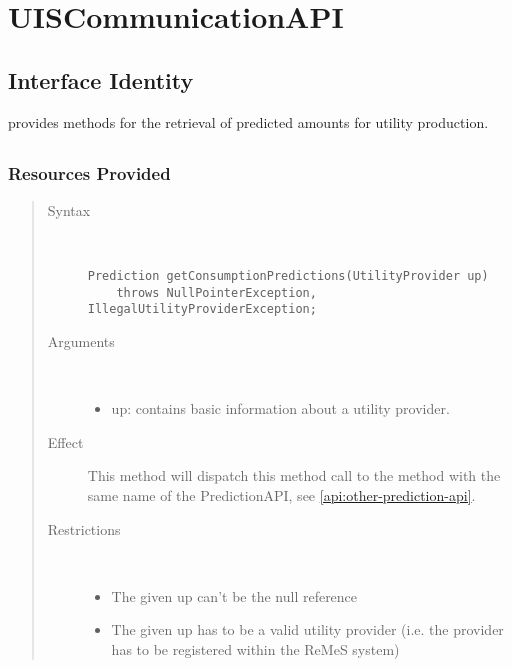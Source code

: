 \section{UISCommunicationAPI}
\label{api:other-uis-communication-api}

\subsection{Interface Identity}

\npar {} provides methods for the retrieval of
predicted amounts for utility production.

\subsection{}

\subsubsection{Resources Provided}

\begin{quote}
	\begin{description}
		\item[Syntax] \
		\begin{verbatim}
Prediction getConsumptionPredictions(UtilityProvider up)
    throws NullPointerException, IllegalUtilityProviderException;
		\end{verbatim}
		\item[Arguments] \
		\begin{itemize}
		  \item up: contains basic information about a utility provider.
		\end{itemize}
		\item[Effect] This method will dispatch this method call to the method with
		the same name of the PredictionAPI, see \ref{api:other-prediction-api}.
		\item[Restrictions] \
		\begin{itemize}
		  \item The given up can't be the null reference
		  \item The given up has to be a valid utility provider (i.e. the provider
		  has to be registered within the ReMeS system)
		\end{itemize}
	\end{description} 
\end{quote}


